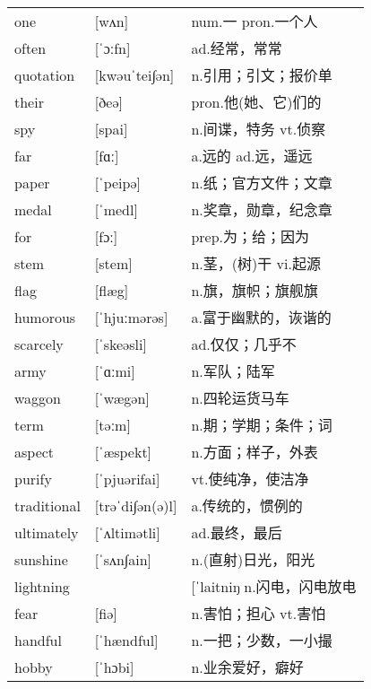 \documentclass[a4paper]{article}
\begin{document}
\section{}
\begin{tabular}{l l l}

one & [wʌn] & num.一 pron.一个人 \\
often & [ˈɔːfn] & ad.经常，常常 \\
quotation & [kwəuˈtei∫ən] & n.引用；引文；报价单 \\
their & [ðeə] & pron.他(她、它)们的 \\
spy & [spai] & n.间谍，特务 vt.侦察 \\
far & [fɑː] & a.远的 ad.远，遥远 \\
paper & [ˈpeipə] & n.纸；官方文件；文章 \\
medal & [ˈmedl] & n.奖章，勋章，纪念章 \\
for & [fɔː] & prep.为；给；因为 \\
stem & [stem] & n.茎，(树)干 vi.起源 \\
flag & [flæg] & n.旗，旗帜；旗舰旗 \\
humorous & [ˈhjuːmərəs] & a.富于幽默的，诙谐的 \\
scarcely & [ˈskeəsli] & ad.仅仅；几乎不 \\
army & [ˈɑːmi] & n.军队；陆军 \\
waggon & [ˈwægən] & n.四轮运货马车 \\
term & [təːm] & n.期；学期；条件；词 \\
aspect & [ˈæspekt] & n.方面；样子，外表 \\
purify & [ˈpjuərifai] & vt.使纯净，使洁净 \\
traditional & [trəˈdi∫ən(ə)l] & a.传统的，惯例的 \\
ultimately & [ˈʌltimətli] & ad.最终，最后 \\
sunshine & [ˈsʌn∫ain] & n.(直射)日光，阳光 \\
lightning &  & [ˈlaitniŋn.闪电，闪电放电 \\
fear & [fiə] & n.害怕；担心 vt.害怕 \\
handful & [ˈhændful] & n.一把；少数，一小撮 \\
hobby & [ˈhɔbi] & n.业余爱好，癖好 \\

\end{tabular}
\end{document}

